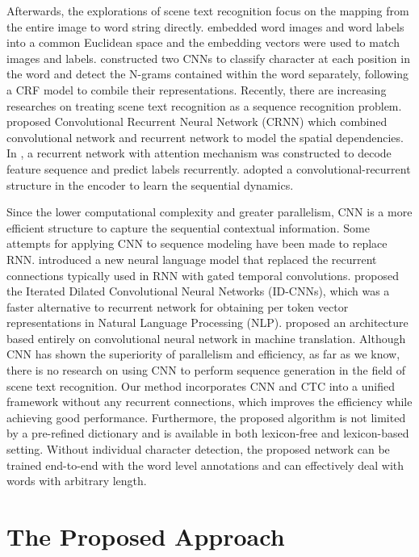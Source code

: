 \documentclass[letterpaper]{article} %
\begin{document}
Afterwards, the explorations of scene text recognition focus on the mapping from the entire image to word string directly. \cite{almazan2014word} embedded word images and word labels into a common Euclidean space and the embedding vectors were used to match images and labels. \cite{jaderberg2014deep} constructed two CNNs to classify character at each position in the word and detect the N-grams contained within the word separately, following a CRF model to combile their representations. Recently, there are increasing researches on treating scene text recognition as a sequence recognition problem. \cite{shi2016end} proposed Convolutional Recurrent Neural Network (CRNN) which combined convolutional network and recurrent network to model the spatial dependencies. In \cite{lee2016recursive}, a recurrent network with attention mechanism was constructed to decode feature sequence and predict labels recurrently. \cite{shi2016robust} adopted a convolutional-recurrent structure in the encoder to learn the sequential dynamics. \par

Since the lower computational complexity and greater parallelism, CNN is a more efficient structure to capture the sequential contextual information. Some attempts for applying CNN to sequence modeling have been made to replace RNN. \cite{dauphin2016language} introduced a new neural language model that replaced the recurrent connections typically used in RNN with gated temporal convolutions. \cite{strubell2017fast} proposed the Iterated Dilated Convolutional Neural Networks (ID-CNNs), which was a faster alternative to recurrent network for obtaining per token vector representations in Natural Language Processing (NLP). \cite{gehring2017convolutional} proposed an architecture based entirely on convolutional neural network in machine translation. Although CNN has shown the superiority of parallelism and efficiency, as far as we know, there is no research on using CNN to perform sequence generation in the field of scene text recognition. Our method incorporates CNN and CTC into a unified framework without any recurrent connections, which improves the efficiency while achieving good performance. Furthermore, the proposed algorithm is not limited by a pre-refined dictionary and is available in both lexicon-free and lexicon-based setting. Without individual character detection, the proposed network can be trained end-to-end with the word level annotations and can effectively deal with words with arbitrary length.

\section{The Proposed Approach}
\end{document}
